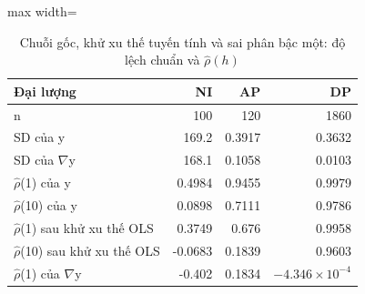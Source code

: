 \begin{table}[H]
\centering\small
\caption{Chuỗi gốc, khử xu thế tuyến tính và sai phân bậc một: độ lệch chuẩn và $\hat\rho(h)$}\label{tab:tab_b12_01_levels_vs_differences}
\begin{adjustbox}{max width=\linewidth}
\begin{tabular}{lrrr}
\toprule
Đại lượng & NI & AP & DP \\
\midrule
n & 100 & 120 & 1860 \\
SD của y & 169.2 & 0.3917 & 0.3632 \\
SD của $\nabla$y & 168.1 & 0.1058 & 0.0103 \\
$\hat{\rho}$(1) của y & 0.4984 & 0.9455 & 0.9979 \\
$\hat{\rho}$(10) của y & 0.0898 & 0.7111 & 0.9786 \\
$\hat{\rho}$(1) sau khử xu thế OLS & 0.3749 & 0.676 & 0.9958 \\
$\hat{\rho}$(10) sau khử xu thế OLS & -0.0683 & 0.1839 & 0.9603 \\
$\hat{\rho}$(1) của $\nabla$y & -0.402 & 0.1834 & $-4.346\times10^{-4}$ \\
\bottomrule
\end{tabular}
\end{adjustbox}
\end{table}
